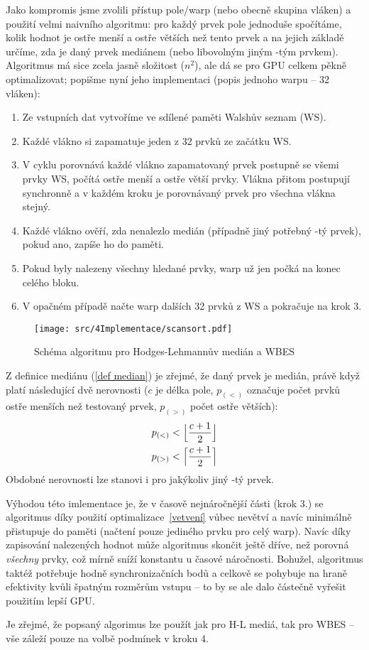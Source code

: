     Jako kompromis jsme zvolili přístup pole/warp (nebo obecně skupina vláken) a použití velmi naivního algoritmu: pro každý prvek pole jednoduše spočítáme, kolik hodnot je ostře menší a ostře větších než tento prvek a na jejich základě určíme, zda je daný prvek mediánem (nebo libovolným jiným \kk-tým prvkem). Algoritmus má sice zcela jasně složitost \OOO($n^2$), ale dá se pro GPU celkem pěkně optimalizovat; popišme nyní jeho implementaci (popis jednoho warpu -- 32 vláken):
    \begin{enumerate}
      \item Ze vstupních dat vytvoříme ve sdílené paměti Walshův seznam (WS).
      \item Každé vlákno si zapamatuje jeden z 32 prvků ze začátku WS.
      \item V cyklu porovnává každé vlákno zapamatovaný prvek postupně se všemi prvky WS, počítá ostře menší a ostře větší prvky. Vlákna přitom postupují synchronně a v každém kroku je porovnávaný prvek pro všechna vlákna stejný.
      \item Každé vlákno ověří, zda nenalezlo medián (případně jiný potřebný \kk-tý prvek), pokud ano, zapíše ho do paměti.
      \item Pokud byly nalezeny všechny hledané prvky, warp už jen počká na konec celého bloku.
      \item V opačném případě načte warp dalších 32 prvků z WS a pokračuje na krok 3.
    \end{enumerate}
    \begin{figure}[h]
    \begin{center}
      \texttt{[image: src/4Implementace/scansort.pdf]}
      \caption{Schéma algoritmu pro Hodges-Lehmannův medián a WBES}
    \end{center}
    \end{figure}

    Z definice mediánu (\ref{def median}) je zřejmé, že daný prvek je medián, právě když platí následující dvě nerovnosti ($c$ je délka pole, $p_{(<)}$ označuje počet prvků ostře menších než testovaný prvek, $p_{(>)}$ počet ostře větších):
    \begin{align}
      p_{(<)} < \Big\lfloor\frac{c+1}{2}\Big\rfloor \notag \\
      p_{(>)} < \Big\lceil\frac{c+1}{2}\Big\rceil \notag
    \end{align}
    Obdobné nerovnosti lze stanovi i pro jakýkoliv jiný \kk-tý prvek.

    Výhodou této imlementace je, že v časově nejnáročnější části (krok 3.) se algoritmus díky použití optimalizace~\ref{vetvení} vůbec nevětví a navíc minimálně přistupuje do paměti (načtení pouze jediného prvku pro celý warp). Navíc díky zapisování nalezených hodnot může algoritmus skončit ještě dříve, než porovná \emph{všechny} prvky, což mírně sníží konstantu u časové náročnosti. Bohužel, algoritmus taktéž potřebuje hodně synchronizačních bodů a celkově se pohybuje na hraně efektivity kvůli špatným rozměrům vstupu -- to by se ale dalo částečně vyřešit použitím lepší GPU.

    Je zřejmé, že popsaný algorimus lze použít jak pro H-L mediá, tak pro WBES -- vše záleží pouze na volbě podmínek v kroku 4.